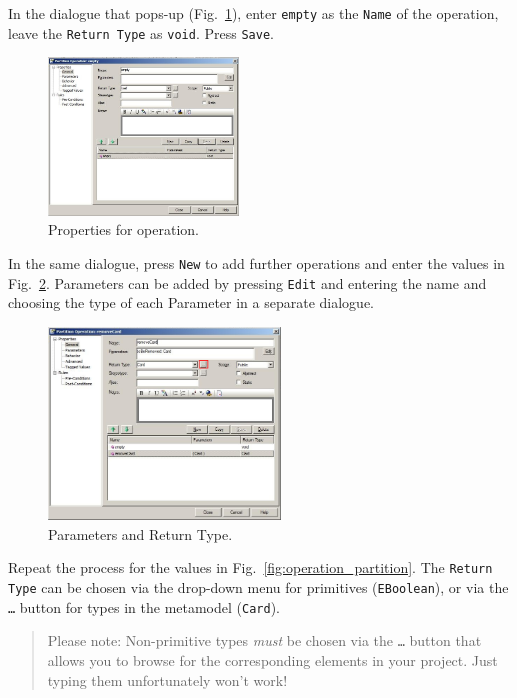 In the dialogue that pops-up (Fig.~\ref{fig:operation_properties}), enter
\texttt{empty} as the \texttt{Name} of the operation, leave the \texttt{Return
Type} as \texttt{void}.  Press \texttt{Save}.
 
\begin{figure}[htbp]
	\centering
  \includegraphics[width=0.45\textwidth]{pics/memBox37.png}
	\caption{Properties for operation.}
	\label{fig:operation_properties}
\end{figure}

\clearpage

In the same dialogue, press \texttt{New} to add further operations and enter the
values in Fig.~\ref{fig:operation_parameters}.  Parameters can be added by
pressing \texttt{Edit} and entering the name and choosing the type of each
Parameter in a separate dialogue.

\begin{figure}[htbp]
	\centering
  \includegraphics[width=0.55\textwidth]{pics/memBox38.png}
	\caption{Parameters and Return Type.}
	\label{fig:operation_parameters} 
\end{figure}

Repeat the process for the values in Fig.~\ref{fig:operation_partition}.  The
\texttt{Return Type} can be chosen via the drop-down menu for primitives
(\texttt{EBoolean}), or via the \texttt{\ldots} button for types in the
metamodel (\texttt{Card}). 

\vspace{-.6cm}
\begin{quote}
Please note: Non-primitive types \emph{must} be chosen via the
\texttt{\ldots} button that allows you to browse for the corresponding elements in your
project.  Just typing them unfortunately won't work!
\end{quote}
\vspace{-.6cm}

